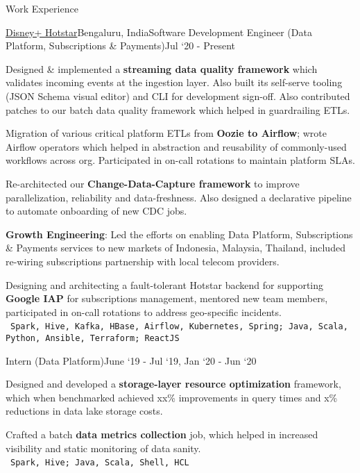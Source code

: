 \documentclass{resume}
\begin{document}
  
  \begin{rSection}{Work Experience}
  
    \begin{rSubsection}{\href{https://tech.hotstar.com/}{Disney+ Hotstar}}{Bengaluru, India}{Software Development Engineer (Data Platform, Subscriptions \& Payments)}{Jul `20 - Present}
      \item Designed \& implemented a \textbf{streaming data quality framework} which validates incoming events at the ingestion layer. Also built its self-serve tooling (JSON Schema visual editor) and CLI for development sign-off. Also contributed patches to our batch data quality framework which helped in guardrailing ETLs.
      \item Migration of various critical platform ETLs from \textbf{Oozie to Airflow}; wrote Airflow operators which helped in abstraction and reusability of commonly-used workflows across org. Participated in on-call rotations to maintain platform SLAs.
      \item Re-architected our \textbf{Change-Data-Capture framework} to improve parallelization, reliability and data-freshness. Also designed a declarative pipeline to automate onboarding of new CDC jobs.
      \item \textbf{Growth Engineering}: Led the efforts on enabling Data Platform, Subscriptions \& Payments services to new markets of Indonesia, Malaysia, Thailand, included re-wiring subscriptions partnership with local telecom providers.
      \item Designing and architecting a fault-tolerant Hotstar backend for supporting \textbf{Google IAP} for subscriptions management, mentored new team members, participated in on-call rotations to address geo-specific incidents.\\
    \textbullet\ \texttt{Spark, Hive, Kafka, HBase, Airflow, Kubernetes, Spring; Java, Scala, Python, Ansible, Terraform; ReactJS}
    \end{rSubsection}
    
    \vspace*{-\baselineskip}

    \begin{rSubsection}{}{}{Intern (Data Platform)}{June `19 - Jul `19, Jan `20 - Jun `20}
    \item Designed and developed a \textbf{storage-layer resource optimization} framework, which when benchmarked achieved xx\% improvements in query times and x\% reductions in data lake storage costs.
    \item Crafted a batch \textbf{data metrics collection} job, which helped in increased visibility and static monitoring of data sanity.\\
    \textbullet\ \texttt{Spark, Hive; Java, Scala, Shell, HCL}
    \end{rSubsection}


\end{rSection}
\end{document}
